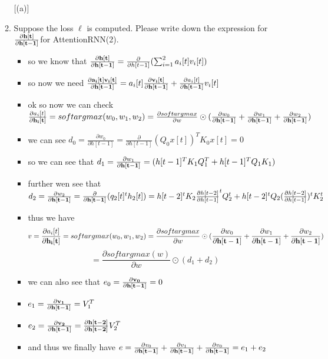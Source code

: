 \documentclass{article}
\begin{document}
\begin{enumerate}[(a)]
\begin{enumerate} [(a)]
        \item Suppose the loss $\ell$ is computed. Please write down the expression
        for$ \frac{\partial \bold{h[t]}}{\partial \bold{h[t-1]}}$for AttentionRNN(2).
        \begin{itemize}
            \color{blue}
            \item so we know that $ \frac{\partial \bold{h[t]}}{\partial \bold{h[t-1]}}=\frac{\partial }{\partial h[t-1]}(\sum_{i=1}^{2}a_{i}[t]v_{i}[t])$
            \item so now we need $\frac{\partial \bold{a_i[t]v_i[t]}}{\partial \bold{h[t-1]}}=a_{i}[t]\frac{\partial \bold{v_i[t]}}{\partial \bold{h[t-1]}}+\frac{\partial {a_i[t]}}{\partial \bold{h[t-1]}}v_i[t]$
            \item ok so now we can check $\frac{\partial a_i[t]}{\partial \bold{h_i[t]}}=softargmax(w_0, w_1, w_2)=\frac{\partial softargmax}{\partial w}\odot(\frac{\partial w_0}{\partial \bold{h[t-1]}}+\frac{\partial w_1}{\partial \bold{h[t-1]}}+\frac{\partial w_2}{\partial \bold{h[t-1]}})$%
            \item we can see $d_0= \frac{\partial w_0}{\partial h[t-1]}=\frac{\partial }{\partial h[t-1]}(Q_{0}x[t])^{T}K_{0}x[t]=0$
            \item so we can see that $d_1 = \frac{\partial w_1}{\partial \bold{h[t-1]}}=(h[t-1]^{T}K_{1}Q_{1}^{T}+h[t-1]^{T}Q_{1}K_{1})$
            \item further wen see that $d_2 =\frac{\partial w_2}{\partial \bold{h[t-1]}}=\frac{\partial}{\partial \bold{h[t-1]}}(q_2[t]^{t}h_2[t])=h[t-2]^{t}K_{2}\frac{\partial h[t-2]}{\partial h[t-1]}^{t}Q_{2}^{t}+h[t-2]^{t}Q_{2}(\frac{\partial h[t-2]}{\partial h[t-1]})^{t}K_{2}^t$
            \item thus we have $$v= \frac{\partial a_i[t]}{\partial \bold{h_i[t]}}=softargmax(w_0, w_1, w_2)=\frac{\partial softargmax}{\partial w}\odot(\frac{\partial w_0}{\partial \bold{h[t-1]}}+\frac{\partial w_1}{\partial \bold{h[t-1]}}+\frac{\partial w_2}{\partial \bold{h[t-1]}})$$ $$=\frac{\partial softargmax(w)}{\partial w}\odot(d_1+d_2)$$
            \item we can also see that $e_0 = \frac{\partial \bold{v_0}}{\partial \bold{h[t-1]}}=0$
            \item $e_1= \frac{\partial \bold{v_1}}{\partial \bold{h[t-1]}}=V_{1}^T$
            \item $e_2 = \frac{\partial \bold{v_2}}{\partial \bold{h[t-1]}}=\frac{\partial \bold{h[t-2]}}{\partial \bold{h[t-2]}}V_{2}^{T}$
            \item and thus we finally have $e=\frac{\partial v_0}{\partial \bold{h[t-1]}}+\frac{\partial v_1}{\partial \bold{h[t-1]}}+\frac{\partial v_0}{\partial \bold{h[t-1]}}=e_1+e_2$

\end{itemize}
\end{enumerate}
\end{enumerate}
\end{document}
